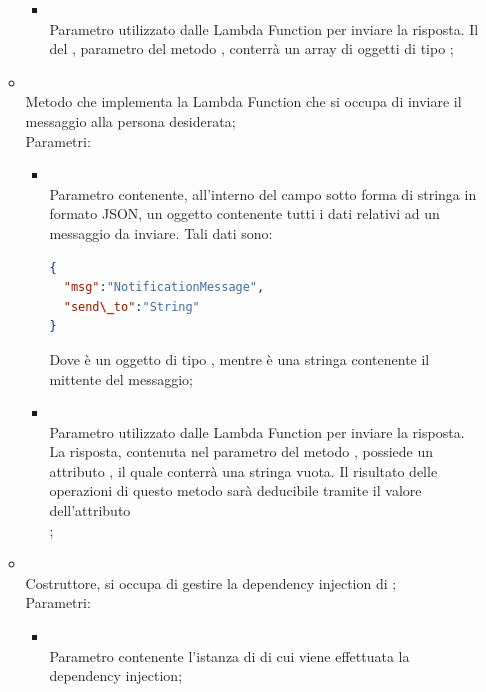 \begin{itemize}
\begin{itemize}
\begin{itemize}
			\item {} \\
			Parametro utilizzato dalle Lambda Function per inviare la risposta. Il  del , parametro del metodo , conterrà un array di oggetti di tipo ;
		\end{itemize}
		\item[]  \\		Metodo che implementa la Lambda Function che si occupa di inviare il messaggio alla persona desiderata;\\
		Parametri:
		\begin{itemize}
			\item {} \\
			Parametro contenente, all'interno del campo  sotto forma di stringa in formato JSON, un oggetto contenente tutti i dati relativi ad un messaggio da inviare.
Tali dati sono:
\begin{lstlisting}[language=json,firstnumber=1]
{
  "msg":"NotificationMessage",
  "send\_to":"String"
}
\end{lstlisting}
Dove  è un oggetto di tipo , mentre  è una stringa contenente il mittente del messaggio;
			\item {} \\
			Parametro utilizzato dalle Lambda Function per inviare la risposta. La risposta, contenuta nel  parametro del metodo , possiede un attributo , il quale conterrà una stringa vuota. Il risultato delle operazioni di questo metodo sarà deducibile tramite il valore dell'attributo \\ ;
		\end{itemize}
		\item[]  \\		Costruttore, si occupa di gestire la dependency injection di ;\\
		Parametri:
		\begin{itemize}
			\item {} \\
			Parametro contenente l'istanza di  di cui viene effettuata la dependency injection;

\end{itemize}
\end{itemize}
\end{itemize}
